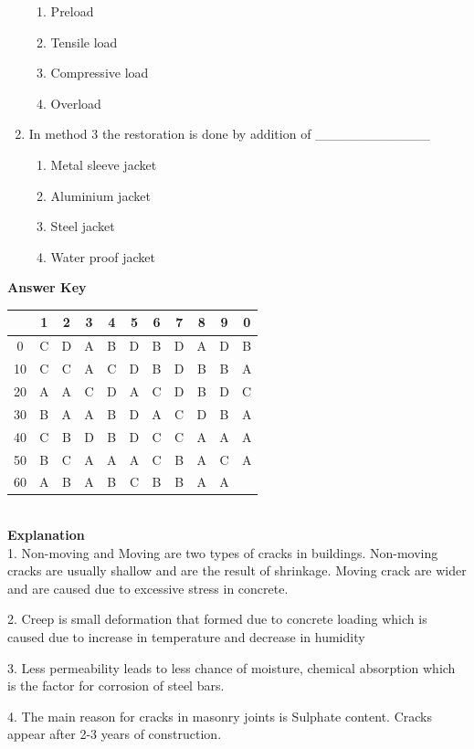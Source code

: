 \documentclass[11pt,a4paper]{article}
\begin{document}
\begin{enumerate}
\begin{enumerate}[label=\Alph*.]
\item{Preload}
\item{Tensile load}
\item{Compressive load}
\item{Overload}
\end{enumerate}
\item{In method 3 the restoration is done by addition of \_\_\_\_\_\_\_\_\_\_\_\_}
\begin{enumerate}[label=\Alph*.]
\item{Metal sleeve jacket}
\item{Aluminium jacket}
\item{Steel jacket}
\item{Water proof jacket}
\end{enumerate}
\end{enumerate}
\textbf{Answer Key}
\begin{tabular}{ | c | c c c c c c c c c c | }
\hline
 & 1 & 2 & 3 & 4 & 5 & 6 & 7 & 8 & 9 & 0 \\
\hline
0 & C & D & A & B & D & B & D & A & D & B \\
10 & C & C & A & C & D & B & D & B & B & A \\
20 & A & A & C & D & A & C & D & B & D & C \\
30 & B & A & A & B & D & A & C & D & B & A \\
40 & C & B & D & B & D & C & C & A & A & A \\
50 & B & C & A & A & A & C & B & A & C & A \\
60 & A & B & A & B & C & B & B & A & A &   \\
\hline
\end{tabular}
\\\textbf{Explanation}\\
1.
Non-moving and Moving are two types of cracks in buildings. Non-moving cracks are usually shallow and are the result of shrinkage. Moving crack are wider and are caused due to excessive stress in concrete.

2.
Creep is small deformation that formed due to concrete loading which is caused due to increase in temperature and decrease in humidity

3.
Less permeability leads to less chance of moisture, chemical absorption which is the factor for corrosion of steel bars.

4.
The main reason for cracks in masonry joints is Sulphate content. Cracks appear after 2-3 years of construction.
\end{document}
